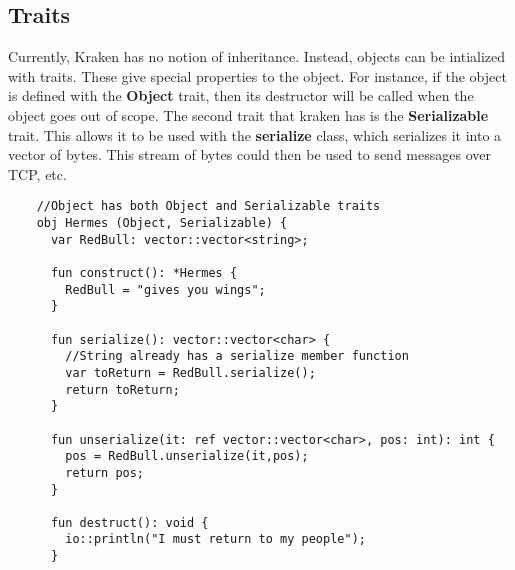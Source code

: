 \documentclass{article}
\begin{document}
  \subsection{Traits}
    Currently, Kraken has no notion of inheritance.  Instead, objects can be
  intialized with traits.  These give special properties to the object.  For
  instance, if the object is defined with the {\bf{Object}} trait, then its
  destructor will be called when the object goes out of scope.  The second trait
  that kraken has is the {\bf{Serializable}} trait.  This allows it to be used
  with the {\bf{serialize}} class, which serializes it into a vector of bytes.
  This stream of bytes could then be used to send messages over TCP, etc.
  \begin{lstlisting} 
    //Object has both Object and Serializable traits
    obj Hermes (Object, Serializable) {
      var RedBull: vector::vector<string>; 
      
      fun construct(): *Hermes {
        RedBull = "gives you wings";
      }
      
      fun serialize(): vector::vector<char> {
        //String already has a serialize member function 
        var toReturn = RedBull.serialize(); 
        return toReturn;
      }

      fun unserialize(it: ref vector::vector<char>, pos: int): int {
        pos = RedBull.unserialize(it,pos);
        return pos;
      }
      
      fun destruct(): void {
        io::println("I must return to my people");
      }

  \end{lstlisting}
\end{document}
